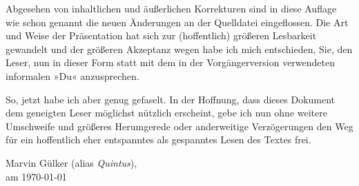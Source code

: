 Abgesehen von inhaltlichen und äußerlichen Korrekturen sind in diese
Auflage wie schon genannt die neuen Änderungen an der Quelldatei
 eingeflossen. Die Art und Weise der Präsentation hat
sich zur (hoffentlich) größeren Lesbarkeit gewandelt und der größeren
Akzeptanz wegen habe ich mich entschieden, Sie, den Leser, nun in
dieser Form statt mit dem in der Vorgängerversion verwendeten
informalen »Du« anzusprechen.

So, jetzt habe ich aber genug gefaselt. In der Hoffnung, dass dieses
Dokument dem geneigten Leser möglichst nützlich erscheint, gebe ich
nun ohne weitere Umschweife und größeres Herumgerede oder anderweitige
Verzögerungen den Weg für ein hoffentlich eher entspanntes als
gespanntes Lesen des Textes frei.

\begin{flushright}
  Marvin Gülker (alias \emph{Quintus}),\\
  am \today
\end{flushright}


